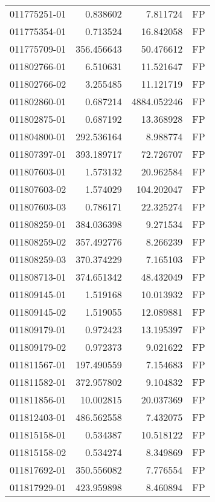 \begin{tabular}{lrrl}
011775251-01 &    0.838602 &       7.811724 &   FP \\
011775354-01 &    0.713524 &      16.842058 &   FP \\
011775709-01 &  356.456643 &      50.476612 &   FP \\
011802766-01 &    6.510631 &      11.521647 &   FP \\
011802766-02 &    3.255485 &      11.121719 &   FP \\
011802860-01 &    0.687214 &    4884.052246 &   FP \\
011802875-01 &    0.687192 &      13.368928 &   FP \\
011804800-01 &  292.536164 &       8.988774 &   FP \\
011807397-01 &  393.189717 &      72.726707 &   FP \\
011807603-01 &    1.573132 &      20.962584 &   FP \\
011807603-02 &    1.574029 &     104.202047 &   FP \\
011807603-03 &    0.786171 &      22.325274 &   FP \\
011808259-01 &  384.036398 &       9.271534 &   FP \\
011808259-02 &  357.492776 &       8.266239 &   FP \\
011808259-03 &  370.374229 &       7.165103 &   FP \\
011808713-01 &  374.651342 &      48.432049 &   FP \\
011809145-01 &    1.519168 &      10.013932 &   FP \\
011809145-02 &    1.519055 &      12.089881 &   FP \\
011809179-01 &    0.972423 &      13.195397 &   FP \\
011809179-02 &    0.972373 &       9.021622 &   FP \\
011811567-01 &  197.490559 &       7.154683 &   FP \\
011811582-01 &  372.957802 &       9.104832 &   FP \\
011811856-01 &   10.002815 &      20.037369 &   FP \\
011812403-01 &  486.562558 &       7.432075 &   FP \\
011815158-01 &    0.534387 &      10.518122 &   FP \\
011815158-02 &    0.534274 &       8.349869 &   FP \\
011817692-01 &  350.556082 &       7.776554 &   FP \\
011817929-01 &  423.959898 &       8.460894 &   FP \\

\end{tabular}
